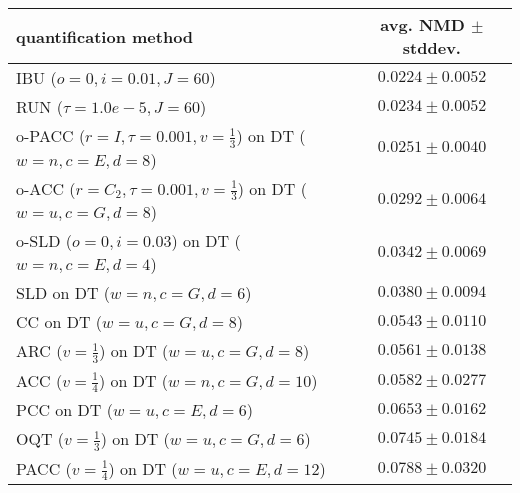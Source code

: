 \begin{tabular}{lc}
  \toprule
  quantification method & avg. NMD $\pm$ stddev. \\
  \midrule
  IBU ($o=0, i=0.01, J=60$) & $\mathbf{0.0224 \pm 0.0052}$ \\
  RUN ($\tau=1.0e-5, J=60$) & $0.0234 \pm 0.0052$ \\
  o-PACC ($r=I, \tau=0.001, v=\frac{1}{3}$) on DT ($w=n, c=E, d=8$) & $0.0251 \pm 0.0040$ \\
  o-ACC ($r=C_2, \tau=0.001, v=\frac{1}{3}$) on DT ($w=u, c=G, d=8$) & $0.0292 \pm 0.0064$ \\
  o-SLD ($o=0, i=0.03$) on DT ($w=n, c=E, d=4$) & $0.0342 \pm 0.0069$ \\
  SLD on DT ($w=n, c=G, d=6$) & $0.0380 \pm 0.0094$ \\
  CC on DT ($w=u, c=G, d=8$) & $0.0543 \pm 0.0110$ \\
  ARC ($v=\frac{1}{3}$) on DT ($w=u, c=G, d=8$) & $0.0561 \pm 0.0138$ \\
  ACC ($v=\frac{1}{4}$) on DT ($w=n, c=G, d=10$) & $0.0582 \pm 0.0277$ \\
  PCC on DT ($w=u, c=E, d=6$) & $0.0653 \pm 0.0162$ \\
  OQT ($v=\frac{1}{3}$) on DT ($w=u, c=G, d=6$) & $0.0745 \pm 0.0184$ \\
  PACC ($v=\frac{1}{4}$) on DT ($w=u, c=E, d=12$) & $0.0788 \pm 0.0320$ \\
  \bottomrule
\end{tabular}

